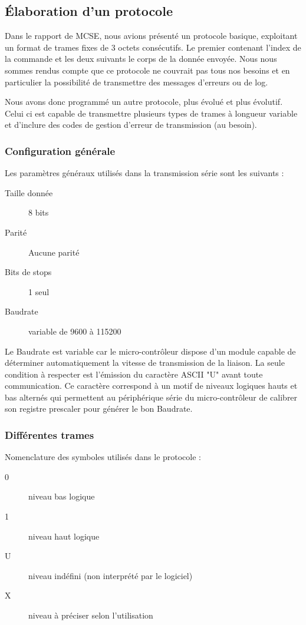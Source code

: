 \documentclass[11pt, french]{article} %
\begin{document}
\subsection{Élaboration d'un protocole}
Dans le rapport de MCSE, nous avions présenté un protocole basique, exploitant un format de trames fixes de 3 octets consécutifs. Le premier contenant l'index de la commande et les deux suivants le corps de la donnée envoyée. Nous nous sommes rendus compte que ce protocole ne couvrait pas tous nos besoins et en particulier la possibilité de transmettre des messages d'erreurs ou de log.

\medskip
Nous avons donc programmé un autre protocole, plus évolué et plus évolutif. Celui ci est capable de transmettre plusieurs types de trames à longueur variable et d'inclure des codes de gestion d'erreur de transmission (au besoin).

\subsubsection{Configuration générale}
\noindent
Les paramètres généraux utilisés dans la transmission série sont les suivants :
\begin{description}
	\item[Taille donnée] 8 bits
	\item[Parité] Aucune parité
	\item[Bits de stops] 1 seul
	\item[Baudrate] variable de 9600 à 115200
\end{description}

\medskip
Le Baudrate est variable car le micro-contrôleur dispose d'un module capable de déterminer automatiquement la vitesse de transmission de la liaison. La seule condition à respecter est l'émission du caractère ASCII "U" avant toute communication. Ce caractère correspond à un motif de niveaux logiques hauts et bas alternés qui permettent au périphérique série du micro-contrôleur de calibrer son registre prescaler pour générer le bon Baudrate.

\subsubsection{Différentes trames}
\noindent
Nomenclature des symboles utilisés dans le protocole :

\medskip
\begin{description}
	\item[0] niveau bas logique
	\item[1] niveau haut logique
	\item[U] niveau indéfini (non interprété par le logiciel)
	\item[X] niveau à préciser selon l'utilisation
\end{description}
\end{document}
